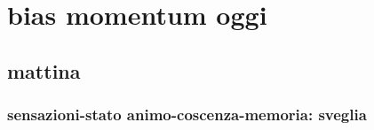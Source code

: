 {\let\clearpage\relax
\chapter{bias momentum oggi}
}
\PartialToc

\listofkeywords

\section{mattina}

\subsection{sensazioni-stato animo-coscenza-memoria: sveglia}

